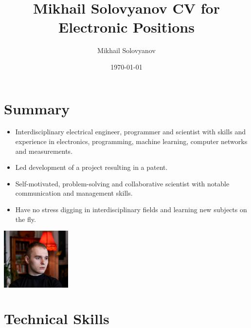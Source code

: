 \documentclass{article}
\title{ Mikhail Solovyanov CV for Electronic Positions}
\author{Mikhail Solovyanov}
\date{\today}
\begin{document}
 
\makecvtitle %

\section{Summary}
\begin{minipage}{0.7\textwidth}
   \begin{itemize}
      \item Interdisciplinary electrical engineer, programmer and scientist with skills and experience in electronics, programming, machine learning, computer networks and measurements.
      \item Led development of a  project resulting in a patent.
      \item Self-motivated, problem-solving and collaborative scientist with notable communication and management skills.
      \item Have no stress digging in interdisciplinary fields and learning new subjects on the fly.
      \end{itemize}
   \end{minipage}%
   \hfill
   \begin{minipage}{0.3\textwidth}
      \includegraphics[width=3.5cm,right]{picture.jpg}
\end{minipage}%




\section{Technical Skills}
 
\end{document}
